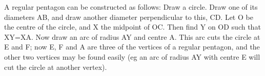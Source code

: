  A regular pentagon can be constructed as follows:
Draw a circle. Draw one of its diameters AB, and draw another diameter
perpendicular to this, CD. Let O be the centre of the circle, and
X the midpoint of OC. Then find Y on OD such that XY=XA. Now
draw an arc of radius AY and centre A. This arc cuts the circle
at E and F; now E, F and A are three of the vertices of a regular pentagon,
and the other two vertices may be found easily (eg an arc of radius
AY with centre E will cut the circle at another vertex).
